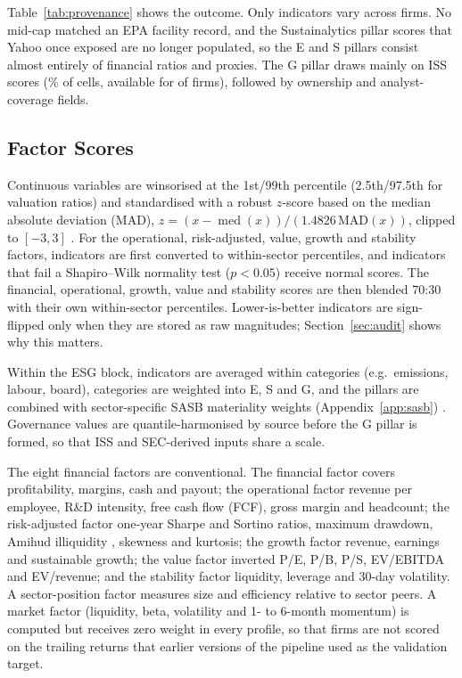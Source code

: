 Table~\ref{tab:provenance} shows the outcome. Only \NIndUsed indicators vary
across firms. No mid-cap matched an EPA facility record, and the
Sustainalytics pillar scores that Yahoo once exposed are no longer
populated, so the E and S pillars consist almost entirely of financial
ratios and proxies. The G pillar draws mainly on ISS scores (\ISSShareG\% of
cells, available for \NISSFirms of \NMid firms), followed by ownership and
analyst-coverage fields.

\begin{table}[t]
\centering
\caption{Provenance of ESG cells used in scoring (\% of cells per pillar,
mid-cap universe). ``Used/declared'' counts indicators with cross-sectional
variation.}
\label{tab:provenance}
\small

\end{table}

\subsection{Factor Scores}
\label{sec:factors}

Continuous variables are winsorised at the 1st/99th percentile (2.5th/97.5th
for valuation ratios) and standardised with a robust $z$-score based on the
median absolute deviation (MAD),
$z=(x-\operatorname{med}(x))/(1.4826\,\mathrm{MAD}(x))$, clipped to $[-3,3]$
\cite{iglewicz_1993}. For the operational, risk-adjusted, value, growth and
stability factors, indicators are first converted to within-sector
percentiles, and indicators that fail a Shapiro--Wilk normality test
($p<0.05$) receive normal scores. The financial, operational, growth, value
and stability scores are then blended 70:30 with their own within-sector
percentiles. Lower-is-better indicators are sign-flipped only when they are
stored as raw magnitudes; Section~\ref{sec:audit} shows why this matters.

Within the ESG block, indicators are averaged within categories (e.g.\
emissions, labour, board), categories are weighted into E, S and G, and the
pillars are combined with sector-specific SASB materiality weights
(Appendix~\ref{app:sasb}) \cite{khan_2016, sasb_2023}. Governance values are
quantile-harmonised by source before the G pillar is formed, so that ISS and
SEC-derived inputs share a scale.

The eight financial factors are conventional. The financial factor covers
profitability, margins, cash and payout; the operational factor revenue per
employee, R\&D intensity, free cash flow (FCF), gross margin and headcount;
the risk-adjusted factor one-year Sharpe and Sortino ratios, maximum
drawdown, Amihud illiquidity \cite{amihud_2002}, skewness and kurtosis; the
growth factor revenue, earnings and sustainable growth; the value factor
inverted P/E, P/B, P/S, EV/EBITDA and EV/revenue; and the stability factor
liquidity, leverage and 30-day volatility. A sector-position factor measures
size and efficiency relative to sector peers. A market factor (liquidity,
beta, volatility and 1- to 6-month momentum) is computed but receives zero
weight in every profile, so that firms are not scored on the trailing
returns that earlier versions of the pipeline used as the validation target.

